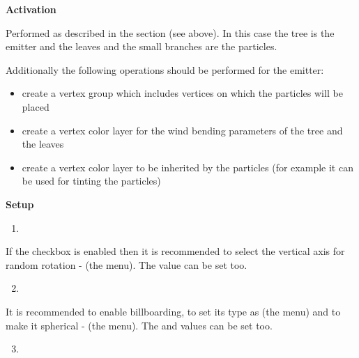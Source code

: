 \documentclass[a4paper,12pt,oneside]{sphinxmanual}
\begin{document}
\textbf{Activation}

Performed as described in the  section (see above). In this case the tree is the emitter and the leaves and the small branches are the particles.

Additionally the following operations should be performed for the emitter:
\begin{itemize}
\item {} 
create a vertex group which includes vertices on which the particles will be placed

\item {} 
create a vertex color layer for the wind bending parameters of the tree and the leaves

\item {} 
create a vertex color layer to be inherited by the particles (for example it can be used for tinting the particles)

\end{itemize}

\textbf{Setup}
\begin{enumerate}
\item {} 

\end{enumerate}

If the  checkbox is enabled then it is recommended to select the vertical axis for random rotation -  (the  menu). The  value can be set too.
\begin{enumerate}
\setcounter{enumi}{1}
\item {} 

\end{enumerate}

It is recommended to enable billboarding, to set its type as  (the  menu) and to make it spherical -  (the  menu). The  and  values can be set too.
\begin{enumerate}
\setcounter{enumi}{2}
\item {} 

\end{enumerate}
\end{document}
